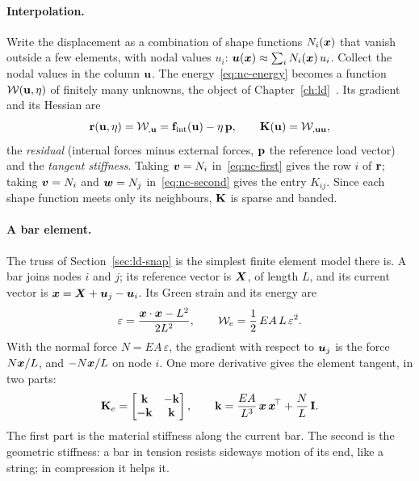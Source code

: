 \paragraph{Interpolation.}
Write the displacement as a combination of shape functions $N_i(\bm{x})$ that vanish
outside a few elements, with nodal values $u_i$:
$\bm{u}(\bm{x}) \approx \sum_i N_i(\bm{x})\,u_i$. Collect the nodal values in the column
$\mathbf{u}$. The energy~\eqref{eq:nc-energy} becomes a function
$\mathcal{W}(\mathbf{u},\eta)$ of finitely many unknowns, the object of
Chapter~\ref{ch:ld}~\cite[slide~5]{nc-triantafyllidis2018}. Its gradient and its Hessian are
\begin{equation}\label{eq:nc-discrete}
  \mathbf{r}(\mathbf{u},\eta) = \mathcal{W}_{,\mathbf{u}} = \mathbf{f}_{\mathrm{int}}(\mathbf{u}) - \eta\,\mathbf{p},
  \qquad
  \mathbf{K}(\mathbf{u}) = \mathcal{W}_{,\mathbf{u}\mathbf{u}} ,
\end{equation}
the \emph{residual} (internal forces minus external forces, $\mathbf{p}$ the reference load
vector) and the \emph{tangent stiffness}. Taking $\bm{v} = N_i$ in~\eqref{eq:nc-first} gives the
row $i$ of $\mathbf{r}$; taking $\bm{v} = N_i$ and $\bm{w} = N_j$ in~\eqref{eq:nc-second} gives the
entry $K_{ij}$. Since each shape function meets only its neighbours, $\mathbf{K}$ is sparse
and banded.

\paragraph{A bar element.}
%
The truss of Section~\ref{sec:ld-snap} is the simplest finite element model there is. A
bar joins nodes $i$ and $j$; its reference vector is $\bm{X}$, of length $L$, and its
current vector is $\bm{x} = \bm{X} + \bm{u}_j - \bm{u}_i$. Its Green strain and its energy are
\begin{equation}\label{eq:nc-bar}
  \varepsilon = \frac{\bm{x}\cdot\bm{x} - L^2}{2L^2},
  \qquad
  \mathcal{W}_e = \frac12\,EA\,L\,\varepsilon^2 .
\end{equation}
With the normal force $N = EA\,\varepsilon$, the gradient with respect to $\bm{u}_j$ is the
force $N\bm{x}/L$, and $-N\bm{x}/L$ on node $i$. One more derivative gives the element
tangent, in two parts:
\begin{equation}\label{eq:nc-bar-K}
  \mathbf{K}_e = \begin{bmatrix} \mathbf{k} & -\mathbf{k}\\ -\mathbf{k} & \mathbf{k}\end{bmatrix},
  \qquad
  \mathbf{k} = \frac{EA}{L^3}\,\bm{x}\,\bm{x}^{\!\top} + \frac NL\,\mathbf{I} .
\end{equation}
The first part is the material stiffness along the current bar. The second is the
geometric stiffness: a bar in tension resists sideways motion of its end, like a
string; in compression it helps it.

